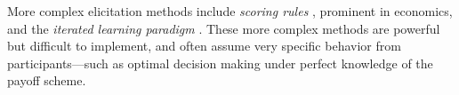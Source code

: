 \documentclass[10pt,letterpaper]{article}
\newcommand{\citep}[1]{\cite{#1}}
\begin{document}
More complex elicitation methods include \emph{scoring rules} \citep{Savage1971:Elicitation-of-,AndersenFountain2014:Estimating-Subj,SchlagTremewan2014:A-penny-for-you}, prominent in economics, and the \emph{iterated learning paradigm} \citep{LewandowskyGriffiths2009:The-Wisdom-of-I}.
These more complex methods are powerful but difficult to implement, and often assume very specific behavior from participants---such as optimal decision making under perfect knowledge of the payoff scheme.
%
\end{document}
